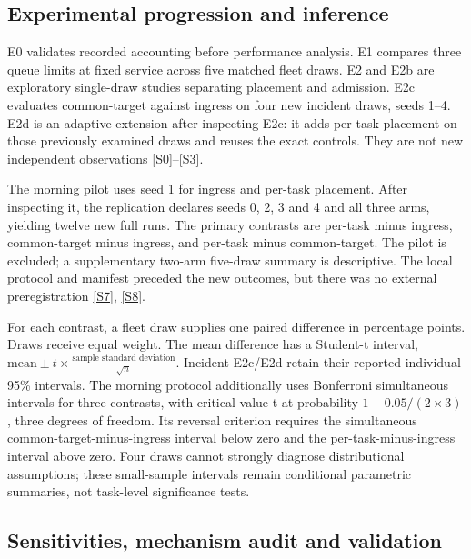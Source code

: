 \documentclass[11pt,a4paper]{article}
\begin{document}
\subsection{Experimental progression and inference}\label{sec:2.6}

E0 validates recorded accounting before performance analysis. E1 compares three queue limits at fixed service across five matched fleet draws. E2 and E2b are exploratory single-draw studies separating placement and admission. E2c evaluates common-target against ingress on four new incident draws, seeds 1--4. E2d is an adaptive extension after inspecting E2c: it adds per-task placement on those previously examined draws and reuses the exact controls. They are not new independent observations \hyperref[source-s0]{[S0]}--\hyperref[source-s3]{[S3]}.

The morning pilot uses seed 1 for ingress and per-task placement. After inspecting it, the replication declares seeds 0, 2, 3 and 4 and all three arms, yielding twelve new full runs. The primary contrasts are per-task minus ingress, common-target minus ingress, and per-task minus common-target. The pilot is excluded; a supplementary two-arm five-draw summary is descriptive. The local protocol and manifest preceded the new outcomes, but there was no external preregistration \hyperref[source-s7]{[S7]}, \hyperref[source-s8]{[S8]}.

For each contrast, a fleet draw supplies one paired difference in percentage points. Draws receive equal weight. The mean difference has a Student-t interval, $\text{mean}\pm t\times\frac{\text{sample standard deviation}}{\sqrt{n}}$. Incident E2c/E2d retain their reported individual 95\% intervals. The morning protocol additionally uses Bonferroni simultaneous intervals for three contrasts, with critical value t at probability $1-0.05/(2\times 3)$, three degrees of freedom. Its reversal criterion requires the simultaneous common-target-minus-ingress interval below zero and the per-task-minus-ingress interval above zero. Four draws cannot strongly diagnose distributional assumptions; these small-sample intervals remain conditional parametric summaries, not task-level significance tests.

\subsection{Sensitivities, mechanism audit and validation}\label{sec:2.7}
\end{document}
